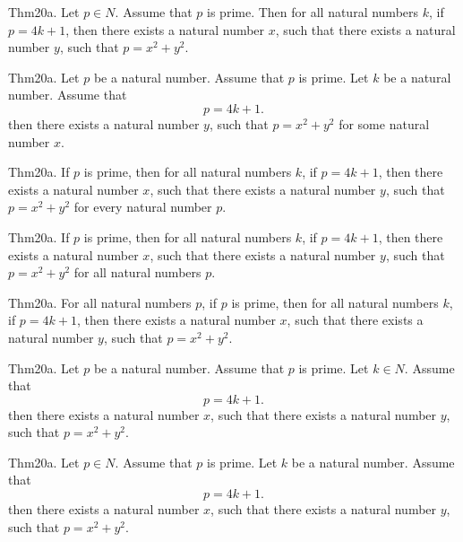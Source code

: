 \documentclass{article}
\begin{document}
Thm20a. Let $p \in N$. Assume that $p$ is prime. Then for all natural numbers $k$, if $p = 4 k + 1$, then there exists a natural number $x$, such that there exists a natural number $y$, such that $p = x ^{ 2}+ y ^{ 2}$.

Thm20a. Let $p$ be a natural number. Assume that $p$ is prime. Let $k$ be a natural number. Assume that $$p = 4 k + 1.$$ then there exists a natural number $y$, such that $p = x ^{ 2}+ y ^{ 2}$ for some natural number $x$.

Thm20a. If $p$ is prime, then for all natural numbers $k$, if $p = 4 k + 1$, then there exists a natural number $x$, such that there exists a natural number $y$, such that $p = x ^{ 2}+ y ^{ 2}$ for every natural number $p$.

Thm20a. If $p$ is prime, then for all natural numbers $k$, if $p = 4 k + 1$, then there exists a natural number $x$, such that there exists a natural number $y$, such that $p = x ^{ 2}+ y ^{ 2}$ for all natural numbers $p$.

Thm20a. For all natural numbers $p$, if $p$ is prime, then for all natural numbers $k$, if $p = 4 k + 1$, then there exists a natural number $x$, such that there exists a natural number $y$, such that $p = x ^{ 2}+ y ^{ 2}$.

Thm20a. Let $p$ be a natural number. Assume that $p$ is prime. Let $k \in N$. Assume that $$p = 4 k + 1.$$ then there exists a natural number $x$, such that there exists a natural number $y$, such that $p = x ^{ 2}+ y ^{ 2}$.

Thm20a. Let $p \in N$. Assume that $p$ is prime. Let $k$ be a natural number. Assume that $$p = 4 k + 1.$$ then there exists a natural number $x$, such that there exists a natural number $y$, such that $p = x ^{ 2}+ y ^{ 2}$.
\end{document}

